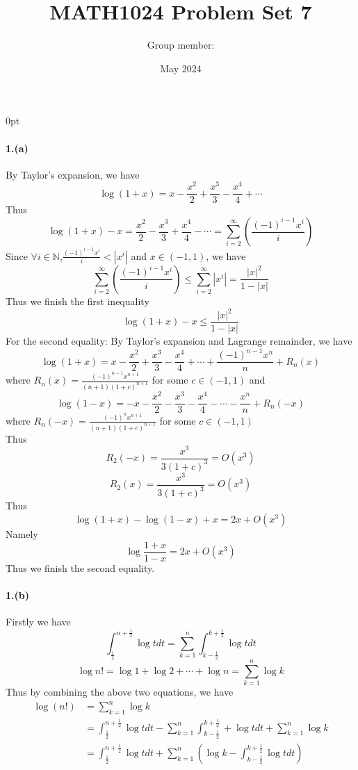 \documentclass{article}
\title{ MATH1024 Problem Set 7}
\author{ Group member:}
\date{May 2024}
\begin{document}
\setlength {\parindent} {0pt}
\maketitle



\paragraph[short]{1.(a)}
{By Taylor's expansion, we have 
$$\log(1+x)=x-\frac{x^2}{2}+\frac{x^3}{3}-\frac{x^4}{4}+\cdots$$
Thus
$$\log(1+x)-x=\frac{x^2}{2}-\frac{x^3}{3}+\frac{x^4}{4}-\cdots=\sum_{i=2}^{\infty}(
\frac{(-1)^{i-1}x^i}{i})$$
Since $\forall i\in\mathbb{N}$,$ \frac{(-1)^{i-1}x^i}{i}<|x^i|$ and $x\in(-1,1)$, 
we have
$$\sum_{i=2}^{\infty}(
    \frac{(-1)^{i-1}x^i}{i})\leq
    \sum_{i=2}^{\infty}|x^i|=\frac{{|x|}^2}{1-|x|}
    $$
Thus we finish the first inequality
$$
\log(1+x)-x\leq\frac{{|x|}^2}{1-|x|}$$
For the second equality:
By Taylor's expansion and Lagrange remainder, we have
$$\log(1+x)=x-\frac{x^2}{2}+\frac{x^3}{3}-\frac{x^4}{4}+\cdots+\frac{(-1)^{n-1}x^n}{n}+R_n(x)$$
where $R_n(x)=\frac{(-1)^{n-1}x^{n+1}}{(n+1)(1+c)^{n+1}}$ for some $c\in(-1,1)$
and 
$$\log(1-x)=
-x-\frac{x^2}{2}-\frac{x^3}{3}-\frac{x^4}{4}-\cdots-\frac{x^n}{n}+R_n(-x)$$
where $R_n(-x)=
\frac{(-1)^{n}x^{n+1}}{(n+1)(1+c)^{n+1}}$ for some $c\in(-1,1)$\\
Thus $$R_2(-x)=\frac{x^3}{3(1+c)^3}=O(x^3)$$ 
$$R_2(x)=\frac{x^3}{3(1+c)^3}=O(x^3)$$
Thus 
$$\log(1+x)-\log(1-x)+x=2x+O(x^3)$$
Namely
$$\log\frac{1+x}{1-x}=2x+O(x^3)$$
Thus we finish the second equality.

}

\paragraph[short]{1.(b)}
{
    Firstly we have
    $$  \int_{\frac{1}{2}}^{n+\frac{1}{2}}\log t dt=\sum_{k=1}^{n}
    \int_{k-\frac{1}{2}}^{k+\frac{1}{2}}\log t dt$$
    $$\log n!=\log 1+\log2 +\cdots+\log n=\sum_{k=1}^{n}\log k$$
    Thus by combining the above two equations, we have
\begin{align*}
\log(n!)&=\sum_{k=1}^{n}\log k\\
&=\int_{\frac{1}{2}}^{n+\frac{1}{2}}\log t dt-
\sum_{k=1}^{n}\int_{k-\frac{1}{2}}^{k+\frac{1}{2}}+\log t dt+\sum_{k=1}^{n}\log k\\
&=\int_{\frac{1}{2}}^{n+\frac{1}{2}}
\log t dt+\sum_{k=1}^{n}\left(\log k-\int_{k-\frac{1}{2}}^{k+\frac{1}{2}}
\log t dt\right)
\end{align*}
}
\end{document}
